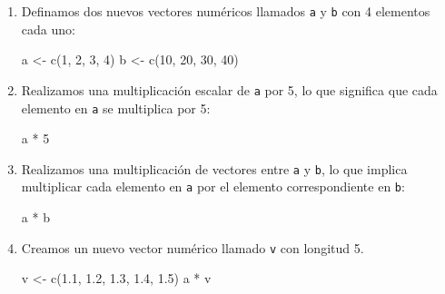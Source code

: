 \documentclass[
  jou,
  floatsintext,
  longtable,
  a4paper,
  nolmodern,
  notxfonts,
  notimes,
  colorlinks=true,linkcolor=blue,citecolor=blue,urlcolor=blue]{apa7}
\newenvironment{Shaded}{\begin{snugshade}}{\end{snugshade}}
\newcommand{\DecValTok}[1]{\textcolor[rgb]{0.68,0.00,0.00}{#1}}
\newcommand{\FloatTok}[1]{\textcolor[rgb]{0.68,0.00,0.00}{#1}}
\newcommand{\FunctionTok}[1]{\textcolor[rgb]{0.28,0.35,0.67}{#1}}
\newcommand{\NormalTok}[1]{\textcolor[rgb]{0.00,0.23,0.31}{#1}}
\newcommand{\OtherTok}[1]{\textcolor[rgb]{0.00,0.23,0.31}{#1}}
\newcommand{\SpecialCharTok}[1]{\textcolor[rgb]{0.37,0.37,0.37}{#1}}
\begin{document}
\begin{enumerate}
\def\labelenumi{\arabic{enumi}.}
\item
  Definamos dos nuevos vectores numéricos llamados \texttt{a} y
  \texttt{b} con 4 elementos cada uno:

\begin{Shaded}
\begin{Highlighting}[]
\NormalTok{a }\OtherTok{\textless{}{-}} \FunctionTok{c}\NormalTok{(}\DecValTok{1}\NormalTok{, }\DecValTok{2}\NormalTok{, }\DecValTok{3}\NormalTok{, }\DecValTok{4}\NormalTok{)}
\NormalTok{b }\OtherTok{\textless{}{-}} \FunctionTok{c}\NormalTok{(}\DecValTok{10}\NormalTok{, }\DecValTok{20}\NormalTok{, }\DecValTok{30}\NormalTok{, }\DecValTok{40}\NormalTok{)}
\end{Highlighting}
\end{Shaded}
\item
  Realizamos una multiplicación escalar de \texttt{a} por 5, lo que
  significa que cada elemento en \texttt{a} se multiplica por 5:

\begin{Shaded}
\begin{Highlighting}[]
\NormalTok{a }\SpecialCharTok{*} \DecValTok{5}
\end{Highlighting}
\end{Shaded}
\item
  Realizamos una multiplicación de vectores entre \texttt{a} y
  \texttt{b}, lo que implica multiplicar cada elemento en \texttt{a} por
  el elemento correspondiente en \texttt{b}:

\begin{Shaded}
\begin{Highlighting}[]
\NormalTok{a }\SpecialCharTok{*}\NormalTok{ b}
\end{Highlighting}
\end{Shaded}
\item
  Creamos un nuevo vector numérico llamado \texttt{v} con longitud 5.

\begin{Shaded}
\begin{Highlighting}[]
\NormalTok{v }\OtherTok{\textless{}{-}} \FunctionTok{c}\NormalTok{(}\FloatTok{1.1}\NormalTok{, }\FloatTok{1.2}\NormalTok{, }\FloatTok{1.3}\NormalTok{, }\FloatTok{1.4}\NormalTok{, }\FloatTok{1.5}\NormalTok{)}
\NormalTok{a }\SpecialCharTok{*}\NormalTok{ v}
\end{Highlighting}
\end{Shaded}
\end{enumerate}
\end{document}
